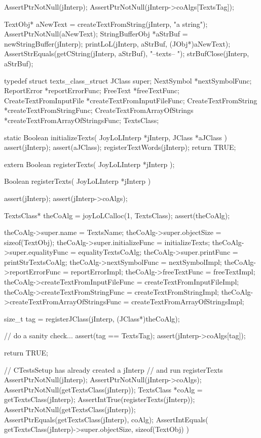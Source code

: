 
\startCTest
  AssertPtrNotNull(jInterp);
  AssertPtrNotNull(jInterp->coAlgs[TextsTag]);

  TextObj* aNewText = createTextFromString(jInterp, "a string");
  AssertPtrNotNull(aNewText);
  StringBufferObj *aStrBuf = newStringBuffer(jInterp);
  printLoL(jInterp, aStrBuf, (JObj*)aNewText);
  AssertStrEquals(getCString(jInterp, aStrBuf), "--texts-- ");
  strBufClose(jInterp, aStrBuf);
\stopCTest
\stopTestCase
\stopTestSuite

\startTestSuite[registerTexts]

\startCHeader
typedef struct texts_class_struct {
  JClass                    super;
  NextSymbol                   *nextSymbolFunc;
  ReportError                  *reportErrorFunc;
  FreeText                     *freeTextFunc;
  CreateTextFromInputFile      *createTextFromInputFileFunc;
  CreateTextFromString         *createTextFromStringFunc;
  CreateTextFromArrayOfStrings *createTextFromArrayOfStringsFunc;
} TextsClass;
\stopCHeader

\startCCode
static Boolean initializeTexts(
  JoyLoLInterp *jInterp,
  JClass   *aJClass
) {
  assert(jInterp);
  assert(aJClass);
  registerTextWords(jInterp);
  return TRUE;
}
\stopCCode

\startCHeader
extern Boolean registerTexts(
  JoyLoLInterp *jInterp
);
\stopCHeader
{}

\startCCode
Boolean registerTexts(
  JoyLoLInterp *jInterp
) {
  assert(jInterp);
  assert(jInterp->coAlgs);
  
  TextsClass* theCoAlg = joyLoLCalloc(1, TextsClass);
  assert(theCoAlg);
  
  theCoAlg->super.name           = TextsName;
  theCoAlg->super.objectSize     = sizeof(TextObj);
  theCoAlg->super.initializeFunc = initializeTexts;
  theCoAlg->super.equalityFunc   = equalityTextsCoAlg;
  theCoAlg->super.printFunc      = printStrTextsCoAlg;
  theCoAlg->nextSymbolFunc       = nextSymbolImpl;
  theCoAlg->reportErrorFunc      = reportErrorImpl;
  theCoAlg->freeTextFunc         = freeTextImpl;
  theCoAlg->createTextFromInputFileFunc = 
    createTextFromInputFileImpl;
  theCoAlg->createTextFromStringFunc =
    createTextFromStringImpl;
  theCoAlg->createTextFromArrayOfStringsFunc =
    createTextFromArrayOfStringsImpl;

  size_t tag =
    registerJClass(jInterp, (JClass*)theCoAlg);
  
  // do a sanity check...
  assert(tag == TextsTag);
  assert(jInterp->coAlgs[tag]);

  return TRUE;
}
\stopCCode


\startCTest
  // CTestsSetup has already created a jInterp
  // and run registerTexts
  AssertPtrNotNull(jInterp);
  AssertPtrNotNull(jInterp->coAlgs);
  AssertPtrNotNull(getTextsClass(jInterp));
  TextsClass *coAlg = getTextsClass(jInterp);
  AssertIntTrue(registerTexts(jInterp));
  AssertPtrNotNull(getTextsClass(jInterp));
  AssertPtrEquals(getTextsClass(jInterp), coAlg);
  AssertIntEquals(
    getTextsClass(jInterp)->super.objectSize,
    sizeof(TextObj)
  )
\stopCTest
\stopTestCase
\stopTestSuite

